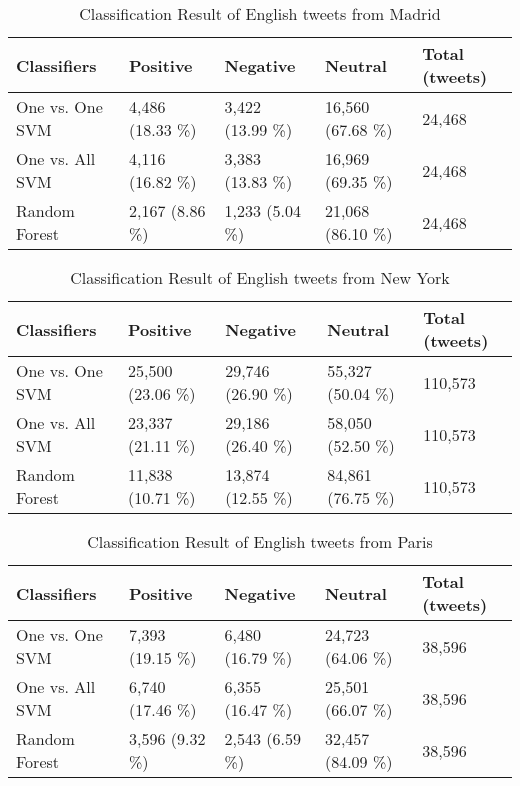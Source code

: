 \begin{table}[ht]
	\caption{Classification Result of English tweets from Madrid}
	\begin{tabular}{|l|p{1.8cm}|p{1.8cm}|p{1.8cm}|p{1.8cm}|} \hline
	Classifiers & Positive & Negative & Neutral & Total (tweets)\\ \hline
One vs. One SVM & 4,486 (18.33 \%) & 3,422 (13.99 \%)& 16,560 (67.68 \%)& 24,468 \\ \hline
One vs. All SVM & 4,116 (16.82 \%)& 3,383 (13.83 \%)& 16,969 (69.35 \%)& 24,468 \\ \hline
Random Forest   & 2,167 (8.86 \%)& 1,233 (5.04 \%)& 21,068 (86.10 \%)& 24,468 \\ \hline
	\end{tabular}
	\label{tab:result_madrid_en}
\end{table}

\begin{table}[ht]
	\caption{Classification Result of English tweets from New York}
	\begin{tabular}{|l|p{1.8cm}|p{1.8cm}|p{1.8cm}|p{1.8cm}|} \hline

	Classifiers & Positive & Negative & Neutral & Total (tweets)\\ \hline
One vs. One SVM & 25,500 (23.06 \%) & 29,746 (26.90 \%)& 55,327 (50.04 \%)& 110,573 \\ \hline
One vs. All SVM & 23,337 (21.11 \%)& 29,186 (26.40 \%)& 58,050 (52.50 \%)& 110,573 \\ \hline
Random Forest   & 11,838 (10.71 \%)& 13,874 (12.55 \%)& 84,861 (76.75 \%)& 110,573 \\ \hline
	\end{tabular}
	\label{tab:result_newyork_en}
\end{table}

\begin{table}[ht]
	\caption{Classification Result of English tweets from Paris}
	\begin{tabular}{|l|p{1.8cm}|p{1.8cm}|p{1.8cm}|p{1.8cm}|} \hline
	Classifiers & Positive & Negative & Neutral & Total (tweets)\\ \hline
One vs. One SVM & 7,393 (19.15  \%)& 6,480 (16.79  \%)& 24,723 (64.06 \%)& 38,596 \\ \hline
One vs. All SVM & 6,740 (17.46 \%)& 6,355 (16.47 \%)& 25,501 (66.07 \%)& 38,596 \\ \hline
Random Forest   & 3,596 (9.32 \%)& 2,543 (6.59 \%)& 32,457 (84.09 \%)& 38,596 \\ \hline
	\end{tabular}
	\label{tab:result_paris_en}
\end{table}


